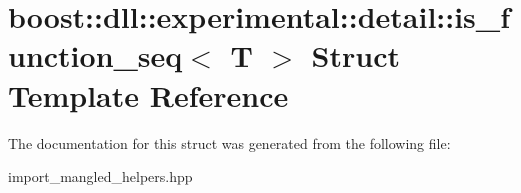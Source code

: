 \hypertarget{a01448}{}\section{boost\+:\+:dll\+:\+:experimental\+:\+:detail\+:\+:is\+\_\+function\+\_\+seq$<$ T $>$ Struct Template Reference}
\label{a01448}


The documentation for this struct was generated from the following file\+:\begin{DoxyCompactItemize}
\item 
import\+\_\+mangled\+\_\+helpers.\+hpp\end{DoxyCompactItemize}
